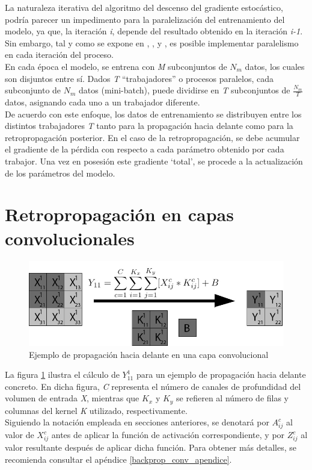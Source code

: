 La naturaleza iterativa del algoritmo del descenso del gradiente estocástico, podría parecer un impedimento para la paralelización del entrenamiento del modelo, ya que, la iteración \textit{i}, depende del resultado obtenido en la iteración \textit{i-1}. Sin embargo, tal y como se expone en \cite{CNN_parallel_Stanford}, \cite{CNN_parallel_International_Conference}, y \cite{CNN_parallel_Ome_Weird_Trick}, es posible implementar paralelismo en cada iteración del proceso. \\
En cada época el modelo, se entrena con \textit{M} subconjuntos de $N_m$ datos, los cuales son disjuntos entre sí. Dados \textit{T} ``trabajadores'' o procesos paralelos, cada subconjunto de $N_m$ datos (mini-batch), puede dividirse en \textit{T} subconjuntos de $\frac{N_m}{T}$ datos, asignando cada uno a un trabajador diferente.\\
De acuerdo con este enfoque, los datos de entrenamiento se distribuyen entre los distintos trabajadores \textit{T} tanto para la propagación hacia delante como para la retropropagación posterior. En el caso de la retropropagación, se debe acumular el gradiente de la pérdida con respecto a cada parámetro obtenido por cada trabajor. Una vez en posesión este gradiente `total', se procede a la actualización de los parámetros del modelo.

\section{Retropropagación en capas convolucionales}

\begin{figure}[H]
	\centering
	\includegraphics[width=0.8\linewidth]{imagenes/conv_ejemplo_backprop_1.jpg} 
	\caption{Ejemplo de propagación hacia delante en una capa convolucional}
	\label{fig:ejemplo_forward_prop_convolucional}
\end{figure}

La figura \ref{fig:ejemplo_forward_prop_convolucional} ilustra el cálculo de $Y^1_{11}$ para un ejemplo de propagación hacia delante concreto. En dicha figura, \textit{C} representa el número de canales de profundidad del volumen de entrada \textit{X}, mientras que ${K_x}$ y ${K_y}$ se refieren al número de filas y columnas del kernel \textit{K} utilizado, respectivamente. \\
Siguiendo la notación empleada en secciones anteriores, se denotará por $A^c_{ij}$ al valor de $X^c_{ij}$ antes de aplicar la función de activación correspondiente, y por $Z^c_{ij}$ al valor resultante después de aplicar dicha función. Para obtener más detalles, se recomienda consultar el apéndice \ref{backprop_conv_apendice}.

